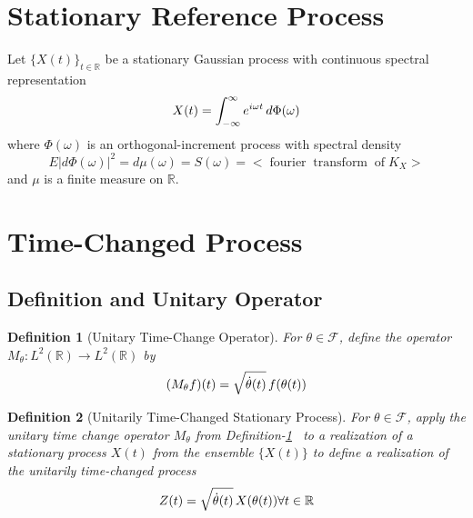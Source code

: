 \documentclass{article}
\newcommand{\tmop}[1]{\ensuremath{\operatorname{#1}}}
\newtheorem{definition}{Definition}
\begin{document}
\section{Stationary Reference Process}\label{sec:stationary}

Let $\{X (t) \}_{t \in \mathbb{R}}$ be a stationary Gaussian process with
continuous spectral representation
\begin{equation}
  \label{eq:stationary_rep} X (t) = \int_{- \infty}^{\infty} e^{i \omega t} 
  \hspace{0.17em} d \Phi (\omega)
\end{equation}
where $\Phi (\omega)$ is an orthogonal-increment process with spectral density
\begin{equation}
  E \lvert d \Phi (\omega) \rvert^2 = d \mu (\omega) = S (\omega) = <
  \tmop{fourier} \tmop{transform} \tmop{of} K_X >
\end{equation}
and $\mu$ is a finite measure on $\mathbb{R}$.

\section{Time-Changed Process}\label{sec:time_change}

\subsection{Definition and Unitary Operator}

\begin{definition}
  [Unitary Time-Change Operator]\label{def:unitary_op}For $\theta \in
  \mathcal{F}$, define the operator $M_{\theta} : L^2 (\mathbb{R}) \to L^2
  (\mathbb{R})$ by
  \begin{equation}
    \label{eq:unitary_op} (M_{\theta} f) (t) = \sqrt{\dot{\theta} (t)} 
    \hspace{0.17em} f (\theta (t))
  \end{equation}
\end{definition}

\begin{definition}
  [Unitarily Time-Changed Stationary Process]\label{def:time_changed_proc} For
  $\theta \in \mathcal{F}$, apply the unitary time change operator
  $M_{\theta}$ from Definition-\ref{def:unitary_op} \ to a realization of a
  stationary process $X (t)$ from the ensemble $\{ X (t) \}$ to define a
  realization of the unitarily time-changed process
  \begin{equation}
    \label{eq:time_change} Z (t) = \sqrt{\dot{\theta} (t)}  \hspace{0.17em} X
    (\theta (t))  \forall t \in \mathbb{R}
  \end{equation}
\end{definition}
\end{document}
